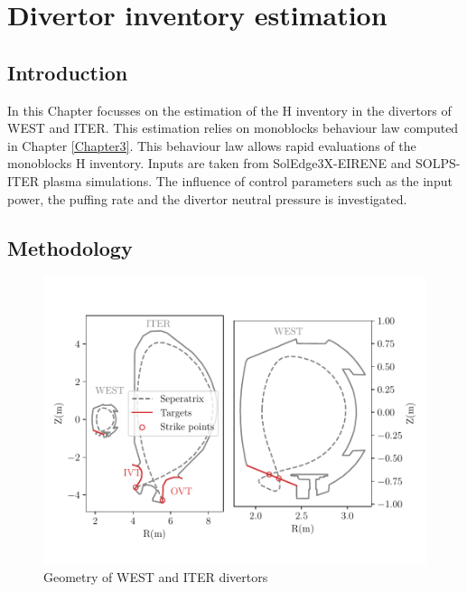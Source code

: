 \setchapterpreamble[u]{\margintoc}
\chapter{Divertor inventory estimation}\label{Chapter4}
\section{Introduction}

In this Chapter focusses on the estimation of the H inventory in the divertors of WEST and ITER.
This estimation relies on monoblocks behaviour law computed in Chapter \ref{Chapter3}.
This behaviour law allows rapid evaluations of the monoblocks H inventory.
Inputs are taken from SolEdge3X-EIRENE  and SOLPS-ITER  plasma simulations.
The influence of control parameters such as the input power, the puffing rate and the divertor neutral pressure is investigated.


\section{Methodology}
\begin{figure}[h!]
    \centering
    \includegraphics[width=0.95\linewidth]{Figures/divertor/coordinates.pdf}
    \caption{Geometry of WEST and ITER divertors}
    \label{fig: reactors}
\end{figure}


